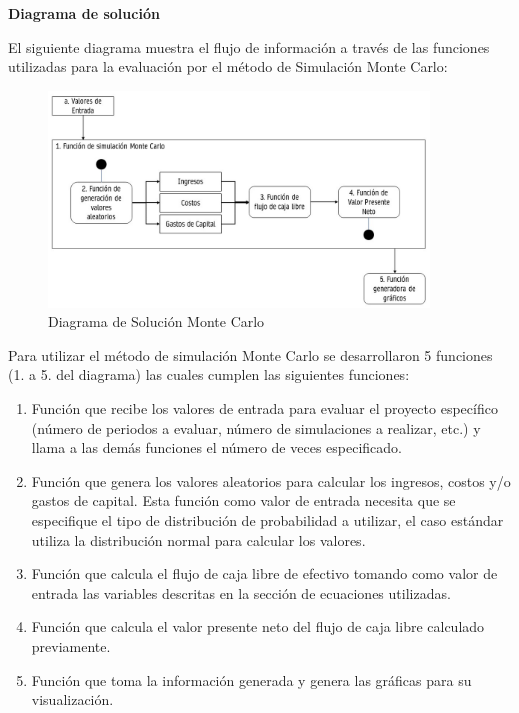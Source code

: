 \documentclass[
]{book}
\providecommand{\tightlist}{%
  \setlength{\itemsep}{0pt}\setlength{\parskip}{0pt}}
\begin{document}
\newpage

\textbf{Diagrama de solución}

El siguiente diagrama muestra el flujo de información a través de las funciones utilizadas para la evaluación por el método de Simulación Monte Carlo:

\begin{figure}
\centering
\includegraphics[width=0.9\textwidth,height=\textheight]{Diagramas/DiagramaMonteCarlo.jpg}
\caption{Diagrama de Solución Monte Carlo}
\end{figure}

Para utilizar el método de simulación Monte Carlo se desarrollaron 5 funciones (1. a 5. del diagrama) las cuales cumplen las siguientes funciones:

\begin{enumerate}
\def\labelenumi{\arabic{enumi}.}
\tightlist
\item
  Función que recibe los valores de entrada para evaluar el proyecto específico (número de periodos a evaluar, número de simulaciones a realizar, etc.) y llama a las demás funciones el número de veces especificado.
\item
  Función que genera los valores aleatorios para calcular los ingresos, costos y/o gastos de capital. Esta función como valor de entrada necesita que se especifique el tipo de distribución de probabilidad a utilizar, el caso estándar utiliza la distribución normal para calcular los valores.
\item
  Función que calcula el flujo de caja libre de efectivo tomando como valor de entrada las variables descritas en la sección de ecuaciones utilizadas.
\item
  Función que calcula el valor presente neto del flujo de caja libre calculado previamente.
\item
  Función que toma la información generada y genera las gráficas para su visualización.
\end{enumerate}
\end{document}

